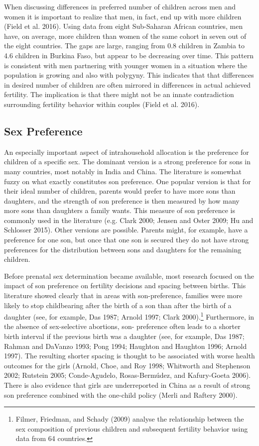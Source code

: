 \documentclass[]{article}
\begin{document}
When discussing differences in preferred number of children across men and women it is important to realize that men, in fact, end up with more children (Field et al. 2016). Using data from eight Sub-Saharan African countries, men have, on average, more children than women of the same cohort in seven out of the eight countries. The gaps are large, ranging from 0.8 children in Zambia to 4.6 children in Burkina Faso, but appear to be decreasing over time. This pattern is consistent with men partnering with younger women in a situation where the population is growing and also with polygyny. This indicates that that differences in desired number of children are often mirrored in differences in actual achieved fertility. The implication is that there might not be an innate contradiction surrounding fertility behavior within couples (Field et al. 2016).

\subsection{Sex Preference}\label{sex-preference}

An especially important aspect of intrahousehold allocation is the preference for children of a specific sex. The dominant version is a strong preference for sons in many countries, most notably in India and China. The literature is somewhat fuzzy on what exactly constitutes son preference. One popular version is that for their ideal number of children, parents would prefer to have more sons than daughters, and the strength of son preference is then measured by how many more sons than daughters a family wants. This measure of son preference is commonly used in the literature (e.g. Clark 2000; Jensen and Oster 2009; Hu and Schlosser 2015). Other versions are possible. Parents might, for example, have a preference for one son, but once that one son is secured they do not have strong preferences for the distribution between sons and daughters for the remaining children.

Before prenatal sex determination became available, most research focused on the impact of son preference on fertility decisions and spacing between births. This literature showed clearly that in areas with son-preference, families were more likely to stop childbearing after the birth of a son than after the birth of a daughter (see, for example, Das 1987; Arnold 1997; Clark 2000).\footnote{Filmer, Friedman, and Schady (2009) analyse the relationship between the sex composition of previous children and subsequent fertility behavior using data from 64 countries.} Furthermore, in the absence of sex-selective abortions, son- preference often leads to a shorter birth interval if the previous birth was a daughter (see, for example, Das 1987; Rahman and DaVanzo 1993; Pong 1994; Haughton and Haughton 1996; Arnold 1997). The resulting shorter spacing is thought to be associated with worse health outcomes for the girls (Arnold, Choe, and Roy 1998; Whitworth and Stephenson 2002; Rutstein 2005; Conde-Agudelo, Rosas-Bermúdez, and Kafury-Goeta 2006). There is also evidence that girls are underreported in China as a result of strong son preference combined with the one-child policy (Merli and Raftery 2000).
\end{document}
